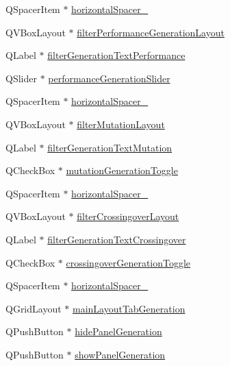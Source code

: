\begin{DoxyCompactItemize}
\item 
Q\+Spacer\+Item $\ast$ \hyperlink{class_ui___g_a___viz_a8ea44a0bcdc90f421bae6b1938a15c64}{horizontal\+Spacer\+\_}
\item 
Q\+V\+Box\+Layout $\ast$ \hyperlink{class_ui___g_a___viz_aa6c8f6f98133f1e12fee1b089dd5e97e}{filter\+Performance\+Generation\+Layout}
\item 
Q\+Label $\ast$ \hyperlink{class_ui___g_a___viz_a9fd6975f3ab4333a09970a5fb8d72533}{filter\+Generation\+Text\+Performance}
\item 
Q\+Slider $\ast$ \hyperlink{class_ui___g_a___viz_a89d04597d8044ff5bb7d0347a0d5a7a2}{performance\+Generation\+Slider}
\item 
Q\+Spacer\+Item $\ast$ \hyperlink{class_ui___g_a___viz_ae6bb65cd75ee527647bde1b7ce35bf61}{horizontal\+Spacer\+\_}
\item 
Q\+V\+Box\+Layout $\ast$ \hyperlink{class_ui___g_a___viz_a02c115236ac8f7a137c0b1235334c8b2}{filter\+Mutation\+Layout}
\item 
Q\+Label $\ast$ \hyperlink{class_ui___g_a___viz_adc4f9dc71d114d03336891f037a0c87c}{filter\+Generation\+Text\+Mutation}
\item 
Q\+Check\+Box $\ast$ \hyperlink{class_ui___g_a___viz_abee288eb4d24e62f831387cfe4f895eb}{mutation\+Generation\+Toggle}
\item 
Q\+Spacer\+Item $\ast$ \hyperlink{class_ui___g_a___viz_ac1187c96eb6e995f8b56e9ca9763ac2e}{horizontal\+Spacer\+\_}
\item 
Q\+V\+Box\+Layout $\ast$ \hyperlink{class_ui___g_a___viz_a2571e4ae714849236659982bdcc92c25}{filter\+Crossingover\+Layout}
\item 
Q\+Label $\ast$ \hyperlink{class_ui___g_a___viz_a61e93020cd32ea87e66861ac58c413e5}{filter\+Generation\+Text\+Crossingover}
\item 
Q\+Check\+Box $\ast$ \hyperlink{class_ui___g_a___viz_a5b0a6ef8cd4d29b0434bebb6cc428870}{crossingover\+Generation\+Toggle}
\item 
Q\+Spacer\+Item $\ast$ \hyperlink{class_ui___g_a___viz_a53178c16eea3431bc28f5e222effdb6e}{horizontal\+Spacer\+\_}
\item 
Q\+Grid\+Layout $\ast$ \hyperlink{class_ui___g_a___viz_aba84c8278cfa37df7dfab8d5f8ef5572}{main\+Layout\+Tab\+Generation}
\item 
Q\+Push\+Button $\ast$ \hyperlink{class_ui___g_a___viz_ab5cb64ecb156c1755339cea9d4c5fd4e}{hide\+Panel\+Generation}
\item 
Q\+Push\+Button $\ast$ \hyperlink{class_ui___g_a___viz_a35c2ba02656cb92a94914d284631cf73}{show\+Panel\+Generation}

\end{DoxyCompactItemize}
